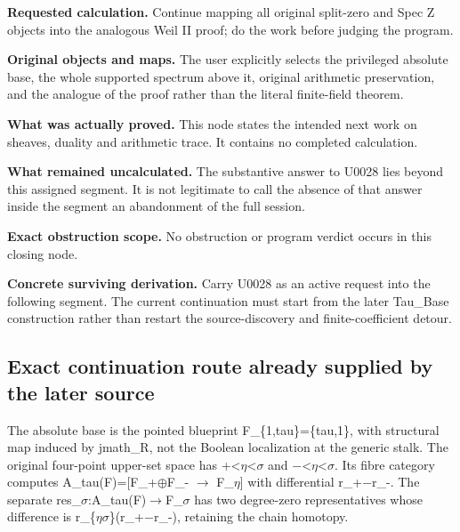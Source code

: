 \textbf{Requested calculation.} Continue mapping all original split-zero
and Spec Z objects into the analogous Weil II proof; do the work before
judging the program.

\textbf{Original objects and maps.} The user explicitly selects the
privileged absolute base, the whole supported spectrum above it,
original arithmetic preservation, and the analogue of the proof rather
than the literal finite-field theorem.

\textbf{What was actually proved.} This node states the intended next
work on sheaves, duality and arithmetic trace. It contains no completed
calculation.

\textbf{What remained uncalculated.} The substantive answer to U0028
lies beyond this assigned segment. It is not legitimate to call the
absence of that answer inside the segment an abandonment of the full
session.

\textbf{Exact obstruction scope.} No obstruction or program verdict
occurs in this closing node.

\textbf{Concrete surviving derivation.} Carry U0028 as an active request
into the following segment. The current continuation must start from the
later Tau\_Base construction rather than restart the source-discovery
and finite-coefficient detour.

\subsection{Exact continuation route already supplied by the later
source}\label{TranscriptLedgerStage:exact-continuation-route-already-supplied-by-the-later-source}

The absolute base is the pointed blueprint F\_\{1,tau\}=\{tau,1\}, with
structural map induced by jmath\_R, not the Boolean localization at the
generic stalk. The original four-point upper-set space has
+<\allowbreak{}\ensuremath{η}\allowbreak{}<\allowbreak{}\ensuremath{σ}\allowbreak{}
and
\allowbreak{}\ensuremath{−}\allowbreak{}<\allowbreak{}\ensuremath{η}\allowbreak{}<\allowbreak{}\ensuremath{σ}\allowbreak{}.
Its fibre category computes
A\_tau(F)=[F\_+\allowbreak{}\ensuremath{⊕}\allowbreak{}F\_-
\allowbreak{}\ensuremath{→}\allowbreak{}
F\_\allowbreak{}\ensuremath{η}\allowbreak{}] with differential
r\_+\allowbreak{}\ensuremath{−}\allowbreak{}r\_-. The separate
res\_\allowbreak{}\ensuremath{σ}\allowbreak{}:A\_tau(F)\allowbreak{}\ensuremath{→}\allowbreak{}F\_\allowbreak{}\ensuremath{σ}\allowbreak{}
has two degree-zero representatives whose difference is
r\_\{\allowbreak{}\ensuremath{η}\allowbreak{}\allowbreak{}\ensuremath{σ}\allowbreak{}\}(r\_+\allowbreak{}\ensuremath{−}\allowbreak{}r\_-),
retaining the chain homotopy.

